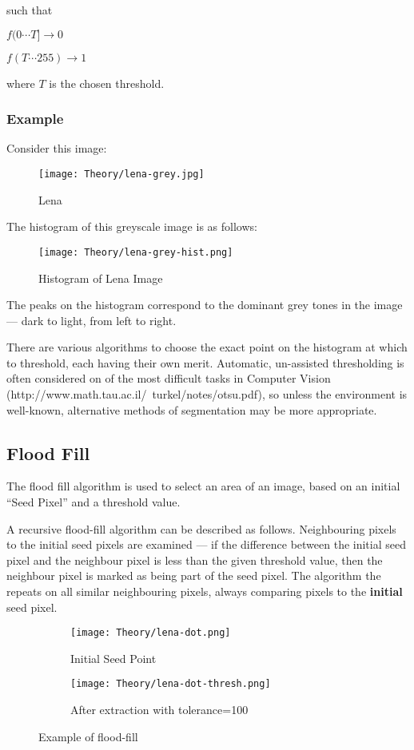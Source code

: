 such that

$f(0\cdots T] \rightarrow 0$

$f(T\cdots 255) \rightarrow 1$

where $T$ is the chosen threshold.
\subsubsection{Example}
Consider this image:

\begin{figure}
    \centering
    \texttt{[image: Theory/lena-grey.jpg]}
    \caption{Lena}
\end{figure}

The histogram of this greyscale image is as follows:

\begin{figure}[H]
    \centering
    \texttt{[image: Theory/lena-grey-hist.png]}
    \caption{Histogram of Lena Image}
\end{figure}

The peaks on the histogram correspond to the dominant grey tones in the image --- dark to light, from left to right.

There are various algorithms to choose the exact point on the histogram at which to threshold, each having their own merit. Automatic, un-assisted thresholding is often considered on of the most difficult tasks in Computer Vision (http://www.math.tau.ac.il/~turkel/notes/otsu.pdf), so unless the environment is well-known, alternative methods of segmentation may be more appropriate.

\subsection{Flood Fill}
\label{sec:floodfill}
The flood fill algorithm is used to select an area of an image, based on an initial ``Seed Pixel'' and a threshold value.

A recursive flood-fill algorithm can be described as follows. Neighbouring pixels to the initial seed pixels are examined --- if the difference between the initial seed pixel and the neighbour pixel is less than the given threshold value, then the neighbour pixel is marked as being part of the seed pixel. The algorithm the repeats on all similar neighbouring pixels, always comparing pixels to the \textbf{initial} seed pixel.

\begin{figure}[H]
    \centering
    \begin{subfigure}[b]{0.45\textwidth}
        \centering
        \texttt{[image: Theory/lena-dot.png]}
        \caption{Initial Seed Point}
    \end{subfigure}
    \begin{subfigure}[b]{0.45\textwidth}
        \centering
        \texttt{[image: Theory/lena-dot-thresh.png]}
        \caption{After extraction with tolerance=100}
    \end{subfigure}
    \caption{Example of flood-fill}
\end{figure}

